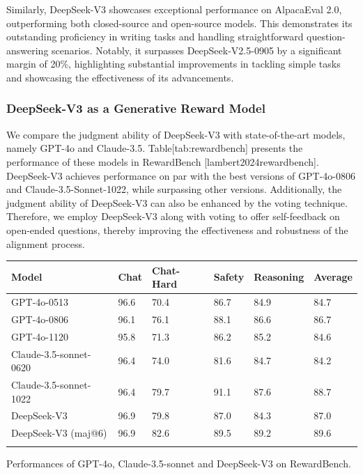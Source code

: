 \documentclass[11pt,a4paper]{article}
\begin{document}
Similarly, DeepSeek-V3 showcases exceptional performance on AlpacaEval 2.0, outperforming both closed-source and open-source models. 
This demonstrates its outstanding proficiency in writing tasks and handling straightforward question-answering scenarios. 
Notably, it surpasses DeepSeek-V2.5-0905 by a significant margin of 20\%, highlighting substantial improvements in tackling simple tasks and showcasing the effectiveness of its advancements.

\subsubsection{DeepSeek-V3 as a Generative Reward Model}

We compare the judgment ability of DeepSeek-V3 with state-of-the-art models, namely GPT-4o and Claude-3.5. 
Table[tab:rewardbench] presents the performance of these models in RewardBench [lambert2024rewardbench].
DeepSeek-V3 achieves performance on par with the best versions of GPT-4o-0806 and Claude-3.5-Sonnet-1022, while surpassing other versions. 
Additionally, the judgment ability of DeepSeek-V3 can also be enhanced by the voting technique. 
Therefore, we employ DeepSeek-V3 along with voting to offer self-feedback on open-ended questions, thereby improving the effectiveness and robustness of the alignment process.

\begin{table}[h]
\begin{tabular}{|l|l|l|l|l|l|}
\hline
Model & Chat & Chat-Hard & Safety & Reasoning & Average \\ \hline
GPT-4o-0513 & 96.6 & 70.4 & 86.7 & 84.9 & 84.7 \\ \hline
GPT-4o-0806 & 96.1 & 76.1 & 88.1 & 86.6 & 86.7 \\ \hline
GPT-4o-1120 & 95.8 & 71.3 & 86.2 & 85.2 & 84.6 \\ \hline
Claude-3.5-sonnet-0620 & 96.4 & 74.0 & 81.6 & 84.7 & 84.2 \\ \hline
Claude-3.5-sonnet-1022 & 96.4 & 79.7 & 91.1 & 87.6 & 88.7 \\ \hline
DeepSeek-V3 & 96.9 & 79.8 & 87.0 & 84.3 & 87.0 \\ \hline
DeepSeek-V3 (maj@6) & 96.9 & 82.6 & 89.5 & 89.2 & 89.6 \\ \hline
 &  &  &  &  &  \\ \hline
\end{tabular}
\end{table}

Performances of GPT-4o, Claude-3.5-sonnet and DeepSeek-V3 on RewardBench.
\end{document}
